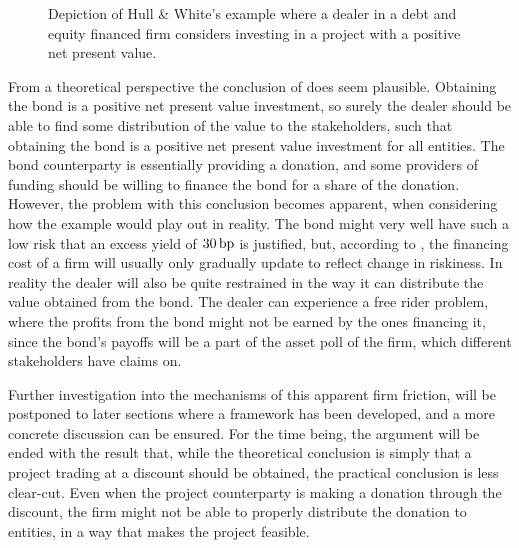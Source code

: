 \documentclass[main.tex]{subfiles}
\begin{document}
            \begin{figure}
                \centering
                \resizebox{10cm}{!}{%
                \begin{tikzpicture}
                    
                \end{tikzpicture}        
                }   
                \caption{
                    Depiction of Hull \& White's example where a dealer in a debt and equity financed firm
                    considers investing in a project with a positive net present value.
                }
                \label{fig:hw-example}
            \end{figure}
            
            From a theoretical perspective the conclusion of \textcite{HullWhite2012FVA} does seem plausible. 
            Obtaining the bond is a positive net present value investment, 
            so surely the dealer should be able to find some distribution of the value to the stakeholders, 
            such that obtaining the bond is a positive net present value investment for all entities.
            The bond counterparty is essentially providing a donation, 
            and some providers of funding should be willing to finance the bond for a share of the donation.
            However, the problem with this conclusion becomes apparent,
            when considering how the example would play out in reality. 
            The bond might very well have such a low risk that an excess yield of $30\,\text{bp}$ is justified, 
            but, according to \textcite{Castagna2012FVA}, 
            the financing cost of a firm will usually only gradually update to reflect change in riskiness.
            In reality the dealer will also be quite restrained 
            in the way it can distribute the value obtained from the bond.
            The dealer can experience a free rider problem, 
            where the profits from the bond might not be earned by the ones financing it,
            since the bond's payoffs will be a part of the asset poll of the firm,
            which different stakeholders have claims on.

            Further investigation into the mechanisms of this apparent firm friction,
            will be postponed to later sections where a framework has been developed,
            and a more concrete discussion can be ensured.  
            For the time being, the argument will be ended with the result that, 
            while the theoretical conclusion is simply that a project trading at a discount should be obtained,
            the practical conclusion is less clear-cut.
            Even when the project counterparty is making a donation through the discount,
            the firm might not be able to properly distribute the donation to entities,
            in a way that makes the project feasible.
\end{document}

